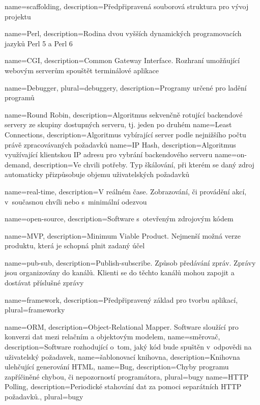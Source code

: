 {
    name={scaffolding},
    description={Předpřipravená souborová struktura pro vývoj projektu}
}

{
    name={Perl},
    description={Rodina dvou vyšších dynamických programovacích jazyků Perl 5 a Perl 6}
}

{
    name={CGI},
    description={Common Gateway Interface. Rozhraní umožňující webovým serverům spouštět terminálové aplikace}
}

{
    name={Debugger},
    plural={debuggery},
    description={Programy určené pro ladění programů}
}

{
    name={Round Robin},
    description={Algoritmus sekvenčně rotující backendové servery ze skupiny dostupných serveru, tj. jeden po druhém}
}
{
    name={Least Connections},
    description={Algoritmus vybírající server podle nejnižšího počtu právě zpracovávaných požadavků}
}
{
    name={IP Hash},
    description={Algoritmus využívající klientskou IP adresu pro vybrání backendového serveru}
}
{
    name={on-demand},
    description={Ve chvili potřeby. Typ škálování, při kterém se daný zdroj automaticky přizpůsobuje objemu uživatelských požadavků}
}

{
    name={real-time},
    description={V reálném čase. Zobrazování, či provádění akcí, v~současnou chvíli nebo s~minimální odezvou}
}

{
    name={open-source},
    description={Software s~otevřeným zdrojovým kódem}
}

{
    name={MVP},
    description={Minimum Viable Product. Nejmenší možná verze produktu, která je schopná plnit zadaný účel}
}

{
    name={pub-sub},
    description={Publish-subscribe. Způsob předávání zpráv. Zprávy jsou organizovány do kanálů. Klienti se do těchto kanálů mohou zapojit a dostávat příslušné zprávy}
}

{
    name={framework},
    description={Předpřipravený základ pro tvorbu aplikací},
    plural={frameworky}
}

{
    name={ORM},
    description={Object-Relational Mapper. Software sloužící pro konverzi dat mezi relačním a objektovým modelem},
}
{
    name={směrovač},
    description={Software rozhodující o~tom, jaký kód bude spuštěn v~odpovědi na uživatelský požadavek},
}
{
    name={šablonovací knihovna},
    description={Knihovna ulehčující generování HTML},
}
{
    name={Bug},
    description={Chyby programu zapříčiněné chybou, či nepozorností programátora},
    plural={bugy}
}
{
    name={HTTP Polling},
    description={Periodické stahování dat za pomoci separátních HTTP požadavků.},
    plural={bugy}
}



